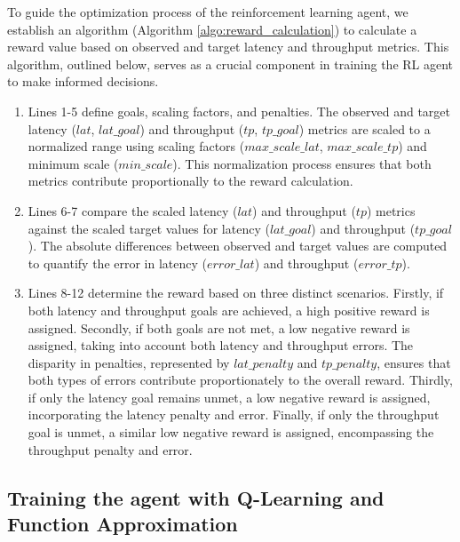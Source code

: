 To guide the optimization process of the reinforcement learning agent, we establish an algorithm (Algorithm \ref{algo:reward_calculation}) to calculate a reward value based on observed and target latency and throughput metrics. This algorithm, outlined below, serves as a crucial component in training the RL agent to make informed decisions.

\begin{enumerate}
  \item Lines 1-5 define goals, scaling factors, and penalties. The observed and target latency ($lat$, $lat\_goal$) and throughput ($tp$, $tp\_goal$) metrics are scaled to a normalized range using scaling factors ($max\_scale\_lat$, $max\_scale\_tp$) and minimum scale ($min\_scale$). This normalization process ensures that both metrics contribute proportionally to the reward calculation.
  \item Lines 6-7 compare the scaled latency ($lat$) and throughput ($tp$) metrics against the scaled target values for latency ($lat\_goal$) and throughput ($tp\_goal$). The absolute differences between observed and target values are computed to quantify the error in latency ($error\_lat$) and throughput ($error\_tp$).
  \item Lines 8-12 determine the reward based on three distinct scenarios. Firstly, if both latency and throughput goals are achieved, a high positive reward is assigned. Secondly, if both goals are not met, a low negative reward is assigned, taking into account both latency and throughput errors. The disparity in penalties, represented by $lat\_penalty$ and $tp\_penalty$, ensures that both types of errors contribute proportionately to the overall reward. Thirdly, if only the latency goal remains unmet, a low negative reward is assigned, incorporating the latency penalty and error. Finally, if only the throughput goal is unmet, a similar low negative reward is assigned, encompassing the throughput penalty and error.
\end{enumerate}

\subsection{Training the agent with Q-Learning and Function Approximation}





